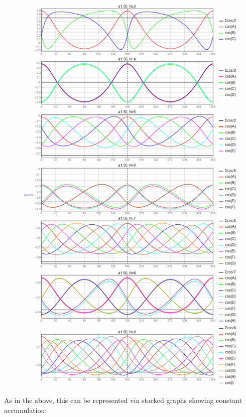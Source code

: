 \documentclass[]{article}
\begin{document}
\begin{figure}[H]

{\centering \includegraphics[width=1\linewidth]{pics/cosine_sums_all} 

}

\end{figure}

As in the above, this can be represented via stacked graphs showing constant accumulation:
\end{document}
